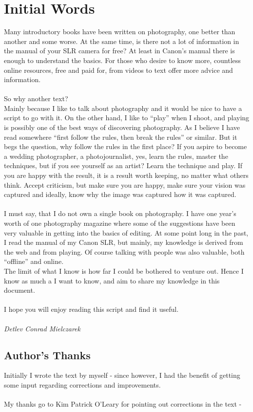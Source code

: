 \chapter*{Initial Words}


Many introductory books have been written on photography, one better than another and some worse. At the same time, is there not a lot of information in the manual of your SLR camera for free? At least in Canon's manual there is enough to understand the basics. For those who desire to know more, countless online resources, free and paid for, from videos to text offer more advice and information.
\\
\\
So why another text?
\\
Mainly because I like to talk about photography and it would be nice to have a script to go with it. On the other hand, I like to ``play'' when I shoot, and playing is possibly one of the best ways of discovering photography. As I believe I have read somewhere ``first follow the rules, then break the rules'' or similar. 
But it begs the question, why follow the rules in the first place? If you aspire to become a wedding photographer, a photojournalist, yes, learn the rules, master the techniques, but if you see yourself as an artist? Learn the technique and play. If you are happy with the result, it is a result worth keeping, no matter what others think. Accept criticism, but make sure you are happy, make sure your vision was captured and ideally, know why the image was captured how it was captured.
\\
\\
I must say, that I do not own a single book on photography. I have one year's worth of one photography magazine where some of the suggestions have been very valuable in getting into the basics of editing. At some point long in the past, I read the manual of my Canon SLR, but mainly, my knowledge is derived from the web and from playing. Of course talking with people was also valuable, both ``offline'' and online.
\\
The limit of what I know is how far I could be bothered to venture out. Hence I know as much a I want to know, and aim to share my knowledge in this document.
\\
\\
I hope you will enjoy reading this script and find it useful.
\\
\\
\textit{Detlev Conrad Mielczarek}


\section*{Author's Thanks}

Initially I wrote the text by myself - since however, I had the benefit of getting some input regarding corrections and improvements.
\\
\\
My thanks go to Kim Patrick O'Leary for pointing out corrections in the text - \url{}